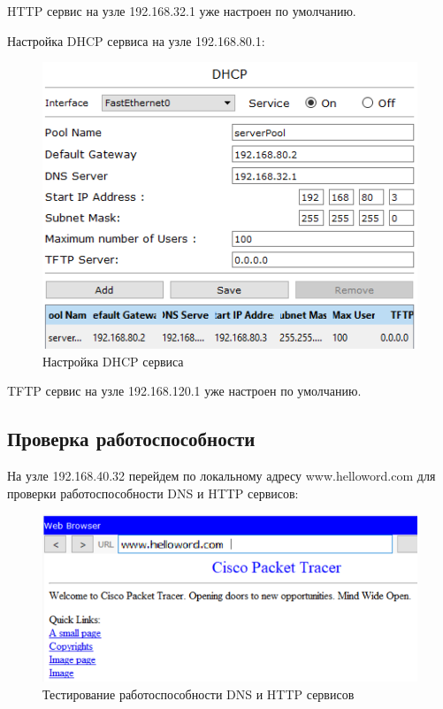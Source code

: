 \documentclass[14pt,a4paper,report]{report}
\begin{document}
HTTP сервис на узле 192.168.32.1 уже настроен по умолчанию.

\clearpage

Настройка DHCP сервиса на узле 192.168.80.1:

\begin{figure}[h!]
	\centering
	\includegraphics[scale = 1.15]{images/9.png}
	\caption{Настройка DHCP сервиса}
\end{figure}

TFTP сервис на узле 192.168.120.1 уже настроен по умолчанию.

\subsection{Проверка работоспособности}

На узле 192.168.40.32 перейдем по локальному адресу www.helloword.com для проверки работоспособности DNS и HTTP сервисов:

\begin{figure}[h!]
	\centering
	\includegraphics[scale = 1.15]{images/10.png}
	\caption{Тестирование работоспособности DNS и HTTP сервисов}
\end{figure}
\end{document}
